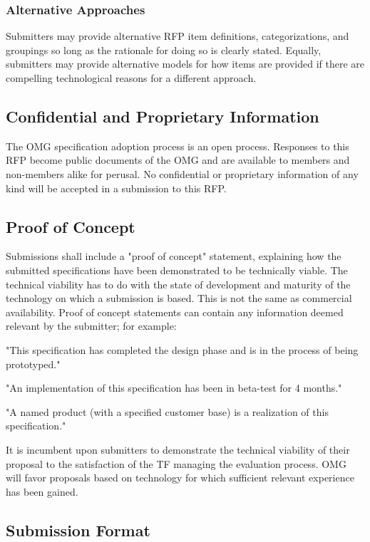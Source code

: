 \subsubsection{Alternative Approaches}

Submitters may provide alternative RFP item definitions, categorizations, and groupings so long as the rationale for doing so is clearly stated. Equally, submitters may provide alternative models for how items are provided if there are compelling technological reasons for a different approach.


\subsection{Confidential and Proprietary Information}

The OMG specification adoption process is an open process. Responses to this RFP become public documents of the OMG and are available to members and non-members alike for perusal. No confidential or proprietary information of any kind will be accepted in a submission to this RFP.


\subsection{Proof of Concept}

Submissions shall include a "proof of concept" statement, explaining how the submitted specifications have been demonstrated to be technically viable. The technical viability has to do with the state of development and maturity of the technology on which a submission is based. This is not the same as commercial availability. Proof of concept statements can contain any information deemed relevant by the submitter; for example:
\begin{adjustwidth}{2em}{}
"This specification has completed the design phase and is in the process of being prototyped."
	
	"An implementation of this specification has been in beta-test for 4 months."
	
	"A named product (with a specified customer base) is a realization of this specification."
\end{adjustwidth}		
It is incumbent upon submitters to demonstrate the technical viability of their proposal to the satisfaction of the TF managing the evaluation process. OMG will favor proposals based on technology for which sufficient relevant experience has been gained.


\subsection{Submission Format}\label{subformat}
